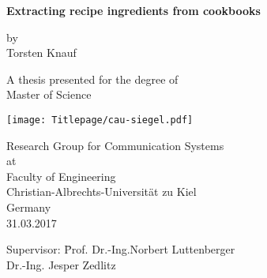 \begin{titlepage}
    \begin{center}
        \vspace*{1cm}
        
        \Huge{\textbf{Extracting recipe ingredients from cookbooks}}
        
        \vspace{1cm}
        
        \Large{by}\\
        \LARGE{Torsten Knauf}
        
        \vspace{1cm}
        
        \Large
        A thesis presented for the degree of\\
        Master of Science
        
        \vspace{1cm}
        
        \texttt{[image: Titlepage/cau-siegel.pdf]}
        
        Research Group for Communication Systems\\
        \large{at} \\
        Faculty of Engineering\\
        Christian-Albrechts-Universität zu Kiel\\
        Germany\\
        31.03.2017
    \end{center}
    
    \vspace{1cm}
    
    \LARGE
    \begin{tabbing}
    Supervisor: \= Prof. Dr.-Ing.Norbert Luttenberger\\
    \> Dr.-Ing. Jesper Zedlitz
    \end{tabbing}
\end{titlepage}